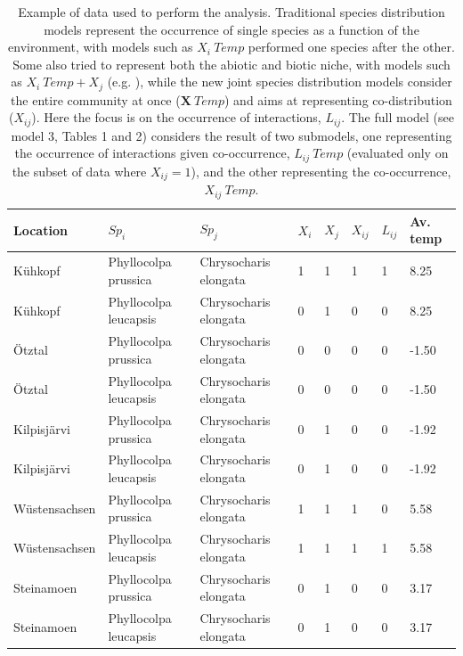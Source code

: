 \documentclass[12pt]{article}
\begin{document}
\begin{table}[]
\centering

\caption{Example of data used to perform the analysis. Traditional species distribution models represent the occurrence of single species as a function of the environment, with models such as $X_i­~Temp$ performed one species after the other. Some also tried to represent both the abiotic and biotic niche, with models such as $X_i­~Temp + X_j$ (e.g. \citealt{GonzalezSalasar2013}), while the new joint species distribution models \citep{Ovaskainen2017} consider the entire community at once ($\mathbf{X}~Temp$) and aims at representing co-distribution ($X_{ij}$). Here the focus is on the occurrence of interactions, $L_{ij}$. The full model (see model 3, Tables 1 and 2) considers the result of two submodels, one representing the occurrence of interactions given co-occurrence, $L_{ij}~Temp$ (evaluated only on the subset of data where $X_{ij}=1$), and the other representing the co-occurrence, $X_{ij}~Temp$.}

\begin{tabular}{llllllll}
\hline

Location & $Sp_i$ & $Sp_j$ & $X_i$ & $X_j$ & $X_{ij}$ & $L_{ij}$ & Av. temp \\ \hline
Kühkopf 		& Phyllocolpa prussica  & Chrysocharis elongata & 1 & 1 & 1 & 1 &  8.25 \\
Kühkopf 		& Phyllocolpa leucapsis & Chrysocharis elongata & 0 & 1 & 0 & 0 &  8.25 \\
Ötztal 			& Phyllocolpa prussica  & Chrysocharis elongata & 0 & 0 & 0 & 0 & -1.50 \\
Ötztal 			& Phyllocolpa leucapsis & Chrysocharis elongata & 0 & 0 & 0 & 0 & -1.50 \\
Kilpisjärvi		& Phyllocolpa prussica  & Chrysocharis elongata & 0 & 1 & 0 & 0 & -1.92 \\
Kilpisjärvi		& Phyllocolpa leucapsis & Chrysocharis elongata & 0 & 1 & 0 & 0 & -1.92 \\
Wüstensachsen	& Phyllocolpa prussica  & Chrysocharis elongata & 1 & 1 & 1 & 0 &  5.58 \\
Wüstensachsen	& Phyllocolpa leucapsis & Chrysocharis elongata & 1 & 1 & 1 & 1 &  5.58 \\
Steinamoen      & Phyllocolpa prussica  & Chrysocharis elongata & 0 & 1 & 0 & 0 &  3.17 \\
Steinamoen      & Phyllocolpa leucapsis & Chrysocharis elongata & 0 & 1 & 0 & 0 &  3.17 \\ 

\hline
\end{tabular}
\end{table}
\end{document}
